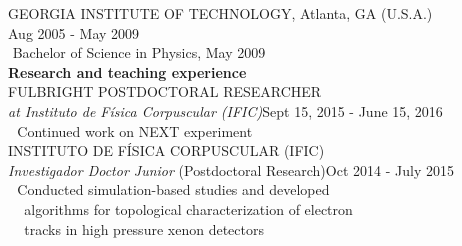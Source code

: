 \indent\hspace{0.2 cm}GEORGIA INSTITUTE OF TECHNOLOGY, Atlanta, GA (U.S.A.)\\
\indent\hspace{0.2 cm}Aug 2005 - May 2009\\

\indent\hspace{0.2 cm}\hspace{0.6 cm}\textbullet\,\,Bachelor of Science in Physics, May 2009\\ %

{\noindent\textbf{Research and teaching experience}}\\

\indent\hspace{0.2 cm}FULBRIGHT POSTDOCTORAL RESEARCHER\\
\indent\hspace{0.2 cm}\hspace{0.6 cm}\emph{at Instituto de F\'{i}sica Corpuscular (IFIC)}\hspace{3.9 cm}Sept 15, 2015 - June 15, 2016\\
\indent\hspace{0.2 cm}\hspace{0.6 cm}\hspace{0.6 cm}\textbullet\,\, Continued work on NEXT experiment\\

\indent\hspace{0.2 cm}INSTITUTO DE F\'{I}SICA CORPUSCULAR (IFIC)\\
\indent\hspace{0.2 cm}\hspace{0.6 cm}\emph{Investigador Doctor Junior} (Postdoctoral Research)\hspace{3.1 cm}Oct 2014 - July 2015\\
\indent\hspace{0.2 cm}\hspace{0.6 cm}\hspace{0.6 cm}\textbullet\,\, Conducted simulation-based studies and developed\\
\indent\hspace{0.2 cm}\hspace{0.6 cm}\hspace{0.6 cm}\,\,\,\,\,\,\,algorithms for topological characterization of electron\\
\indent\hspace{0.2 cm}\hspace{0.6 cm}\hspace{0.6 cm}\,\,\,\,\,\,\,tracks in high pressure xenon detectors\\

